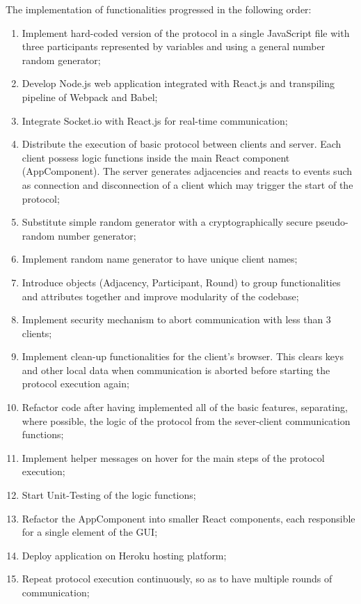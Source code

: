 The implementation of functionalities progressed in the following order:
\begin{enumerate}
    \item Implement hard-coded version of the protocol in a single JavaScript file with three participants represented by variables and using a general number random generator;
    \item Develop Node.js web application integrated with React.js and transpiling pipeline of Webpack and Babel;
    \item Integrate Socket.io with React.js for real-time communication;
    \item Distribute the execution of basic protocol between clients and server. Each client possess logic functions inside the main React component (AppComponent). The server generates adjacencies and reacts to events such as connection and disconnection of a client which may trigger the start of the protocol;
    \item Substitute simple random generator with a cryptographically secure pseudo-random number generator;
    \item Implement random name generator to have unique client names;
    \item Introduce objects (Adjacency, Participant, Round) to group functionalities and attributes together and improve modularity of the codebase;
    \item Implement security mechanism to abort communication with less than 3 clients;
    \item Implement clean-up functionalities for the client's browser. This clears keys and other local data when communication is aborted before starting the protocol execution again;
    \item Refactor code after having implemented all of the basic features, separating, where possible, the logic of the protocol from the sever-client communication functions;
    \item Implement helper messages on hover for the main steps of the protocol execution;
    \item Start Unit-Testing of the logic functions;
    \item Refactor the AppComponent into smaller React components, each responsible for a single element of the GUI;
    \item Deploy application  on Heroku hosting platform;
    \item Repeat protocol execution continuously, so as to have multiple rounds of communication;

\end{enumerate}
